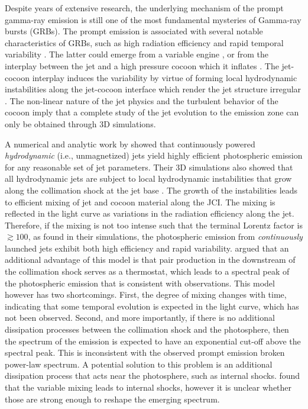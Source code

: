 \documentclass[fleqn,usenatbib]{mnras}
\begin{document}
	Despite years of extensive research, the underlying mechanism of the prompt gamma-ray emission is still one of the most fundamental mysteries of Gamma-ray bursts (GRBs).
	The prompt emission is associated with several notable characteristics of GRBs,
	such as high radiation efficiency \citep[e.g.][]{Granot2006,Ioka2006,Zhang2007,Beniamini2016} and rapid temporal variability \citep[e.g.][]{Ramirez-Ruiz2000,Nakar2002b,Nakar2002c,MacLachlan2012,Bhat2013}. The latter could emerge from a variable engine \citep{Levinson1993,Sari1997,MacFadyen1998,Fenimore1999,Aloy2000}, or from the interplay between the jet and a high pressure cocoon which it inflates \citep[e.g.][]{Aloy2002,Matzner2003,Morsony2007,Gottlieb2019}. The jet-cocoon interplay induces the variability by virtue of forming local hydrodynamic instabilities along the jet-cocoon interface \citep[JCI;][]{Gottlieb2021} which render the jet structure irregular .
	The non-linear nature of the jet physics and the turbulent behavior of the cocoon imply that a complete study of the jet evolution to the emission zone can only be obtained through 3D simulations.
	
	A numerical and analytic work by \citet{Gottlieb2019} showed that continuously powered {\it hydrodynamic} (i.e., unmagnetized) jets yield highly efficient photospheric emission for any reasonable set of jet parameters. Their 3D simulations also showed that all hydrodynamic jets are subject to local hydrodynamic instabilities that grow along the collimation shock at the jet base \citep[see also][]{Meliani2010,Matsumoto2013a,Matsumoto2013,Matsumoto2019,Matsumoto2017,Toma2017,Gourgouliatos2018}. The growth of the instabilities leads to efficient mixing of jet and cocoon material along the JCI. The mixing is reflected in the light curve as variations in the radiation efficiency along the jet.
	Therefore, if the mixing is not too intense such that the terminal Lorentz factor is $ \gtrsim 100 $, as found in their simulations, the photospheric emission from {\it continuously} launched jets exhibit both high efficiency and rapid variability. \citet{Gottlieb2019} argued that an additional advantage of this model is that pair production in the downstream of the collimation shock serves as a thermostat, which leads to a spectral peak of the photospheric emission that is consistent with observations. This model however has two shortcomings. First, the degree of mixing changes with time, indicating that some temporal evolution is expected in the light curve, which has not been observed. Second, and more importantly, if there is no additional dissipation processes between the collimation shock and the photosphere, then the spectrum of the emission is expected to have an exponential cut-off above the spectral peak. This is inconsistent with the observed prompt emission broken power-law spectrum. A potential solution to this problem is an additional dissipation process that acts near the photosphere, such as internal shocks. \citet{Gottlieb2019} found that the variable mixing leads to internal shocks, however it is unclear whether those are strong enough to reshape the emerging spectrum.
	
\end{document}
